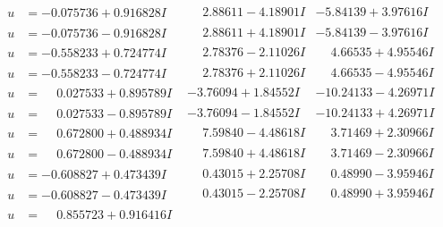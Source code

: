 \documentclass[1p]{elsarticle_modified}
\theoremstyle{definition}
\begin{document}
$$\begin{array}{c|c|c}
\begin{aligned}
u &= -0.075736 + 0.916828 I\end{aligned}
 & \phantom{-}2.88611 - 4.18901 I & -5.84139 + 3.97616 I \\ \hline\begin{aligned}
u &= -0.075736 - 0.916828 I\end{aligned}
 & \phantom{-}2.88611 + 4.18901 I & -5.84139 - 3.97616 I \\ \hline\begin{aligned}
u &= -0.558233 + 0.724774 I\end{aligned}
 & \phantom{-}2.78376 - 2.11026 I & \phantom{-}4.66535 + 4.95546 I \\ \hline\begin{aligned}
u &= -0.558233 - 0.724774 I\end{aligned}
 & \phantom{-}2.78376 + 2.11026 I & \phantom{-}4.66535 - 4.95546 I \\ \hline\begin{aligned}
u &= \phantom{-}0.027533 + 0.895789 I\end{aligned}
 & -3.76094 + 1.84552 I & -10.24133 - 4.26971 I \\ \hline\begin{aligned}
u &= \phantom{-}0.027533 - 0.895789 I\end{aligned}
 & -3.76094 - 1.84552 I & -10.24133 + 4.26971 I \\ \hline\begin{aligned}
u &= \phantom{-}0.672800 + 0.488934 I\end{aligned}
 & \phantom{-}7.59840 - 4.48618 I & \phantom{-}3.71469 + 2.30966 I \\ \hline\begin{aligned}
u &= \phantom{-}0.672800 - 0.488934 I\end{aligned}
 & \phantom{-}7.59840 + 4.48618 I & \phantom{-}3.71469 - 2.30966 I \\ \hline\begin{aligned}
u &= -0.608827 + 0.473439 I\end{aligned}
 & \phantom{-}0.43015 + 2.25708 I & \phantom{-}0.48990 - 3.95946 I \\ \hline\begin{aligned}
u &= -0.608827 - 0.473439 I\end{aligned}
 & \phantom{-}0.43015 - 2.25708 I & \phantom{-}0.48990 + 3.95946 I \\ \hline\begin{aligned}
u &= \phantom{-}0.855723 + 0.916416 I\end{aligned}

\end{array}$$
\end{document}
